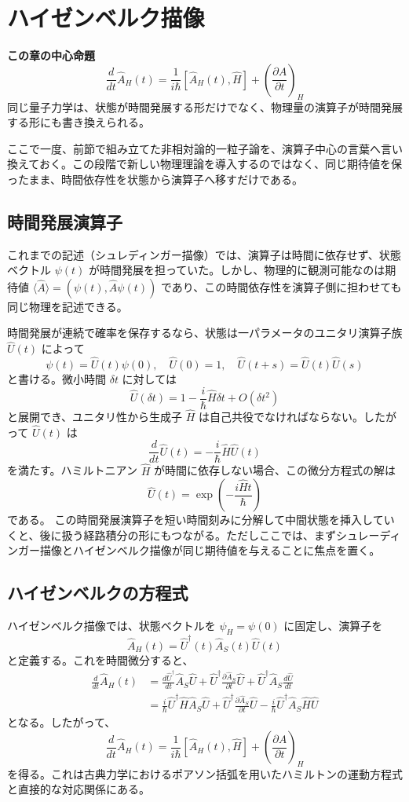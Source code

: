 \section{ハイゼンベルク描像}

\noindent\textbf{この章の中心命題}
\[
\boxed{
\frac{d}{dt}\hat{A}_H(t)
=
\frac{1}{i\hbar}[\hat{A}_H(t),\hat{H}]
+\left(\frac{\partial\hat{A}}{\partial t}\right)_H
}
\]
同じ量子力学は、状態が時間発展する形だけでなく、物理量の演算子が時間発展する形にも書き換えられる。

ここで一度、前節で組み立てた非相対論的一粒子論を、演算子中心の言葉へ言い換えておく。この段階で新しい物理理論を導入するのではなく、同じ期待値を保ったまま、時間依存性を状態から演算子へ移すだけである。

\subsection{時間発展演算子}
これまでの記述（シュレディンガー描像）では、演算子は時間に依存せず、状態ベクトル $\psi(t)$ が時間発展を担っていた。しかし、物理的に観測可能なのは期待値 $\langle \hat{A} \rangle = (\psi(t), \hat{A} \psi(t))$ であり、この時間依存性を演算子側に担わせても同じ物理を記述できる。

時間発展が連続で確率を保存するなら、状態は一パラメータのユニタリ演算子族 $\hat{U}(t)$ によって
\[
\psi(t) = \hat{U}(t)\psi(0), \quad \hat{U}(0)=1, \quad \hat{U}(t+s)=\hat{U}(t)\hat{U}(s)
\]
と書ける。微小時間 $\delta t$ に対しては
\[
\hat{U}(\delta t) = 1 - \frac{i}{\hbar}\hat{H}\delta t + O(\delta t^2)
\]
と展開でき、ユニタリ性から生成子 $\hat{H}$ は自己共役でなければならない。したがって $\hat{U}(t)$ は
\[
\frac{d}{dt}\hat{U}(t) = -\frac{i}{\hbar}\hat{H}\hat{U}(t)
\]
を満たす。ハミルトニアン $\hat{H}$ が時間に依存しない場合、この微分方程式の解は
\[
\hat{U}(t) = \exp\left( -\frac{i\hat{H}t}{\hbar} \right)
\]
である。
この時間発展演算子を短い時間刻みに分解して中間状態を挿入していくと、後に扱う経路積分の形にもつながる。ただしここでは、まずシュレーディンガー描像とハイゼンベルク描像が同じ期待値を与えることに焦点を置く。

\subsection{ハイゼンベルクの方程式}
ハイゼンベルク描像では、状態ベクトルを $\psi_H = \psi(0)$ に固定し、演算子を
\[
\hat{A}_H(t) = \hat{U}^\dagger(t)\hat{A}_S(t)\hat{U}(t)
\]
と定義する。これを時間微分すると、
\begin{align*}
\frac{d}{dt}\hat{A}_H(t)
&= \frac{d\hat{U}^\dagger}{dt}\hat{A}_S\hat{U}
+ \hat{U}^\dagger \frac{\partial \hat{A}_S}{\partial t}\hat{U}
+ \hat{U}^\dagger \hat{A}_S \frac{d\hat{U}}{dt} \\
&= \frac{i}{\hbar}\hat{U}^\dagger \hat{H}\hat{A}_S\hat{U}
+ \hat{U}^\dagger \frac{\partial \hat{A}_S}{\partial t}\hat{U}
- \frac{i}{\hbar}\hat{U}^\dagger \hat{A}_S\hat{H}\hat{U}
\end{align*}
となる。したがって、
\[
\frac{d}{dt}\hat{A}_H(t) = \frac{1}{i\hbar}[\hat{A}_H(t), \hat{H}] + \left(\frac{\partial \hat{A}}{\partial t}\right)_H
\]
を得る。これは古典力学におけるポアソン括弧を用いたハミルトンの運動方程式と直接的な対応関係にある。

